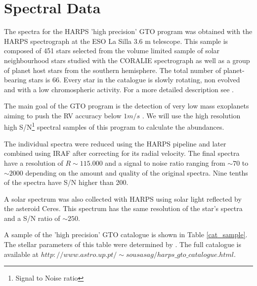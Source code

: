 \documentclass[dvips,12pt,a4paper]{report}
\begin{document}
{\section {Spectral Data}

The spectra for the HARPS 'high precision' GTO program was obtained with the HARPS spectrograph at the ESO La Silla 3.6 m telescope. This sample is composed of 451 stars selected from the volume limited sample of solar neighbourhood stars studied with the CORALIE spectrograph \citep{Udry-2000} as well as a group of planet host stars from the southern hemisphere. The total number of planet-bearing stars is 66. Every star in the catalogue is slowly rotating, non evolved and with a low chromospheric activity. For a more detailed description see \citet{Sousa-2008}.

The main goal of the GTO program is the detection of very low mass exoplanets aiming to push the RV accuracy below  $1m/s$ \citep{Mayor-2003b}. We will use the high resolution high S/N\footnote{Signal to Noise ratio} spectral samples of this program to calculate the abundances.

The individual spectra were reduced using the HARPS pipeline and later combined using IRAF after correcting for its radial velocity. The final spectra have a resolution of $R\sim115.000$ and a signal to noise ratio ranging from $\sim70$ to $\sim2000$ depending on the amount and quality of the original spectra. Nine tenths of the spectra have S/N higher than 200.


A solar spectrum was also collected with HARPS using solar light reflected by the asteroid Ceres. This spectrum has the same resolution of the star's spectra and a S/N ratio of $\sim250$.

A sample of the 'high precision' GTO catalogue is shown in Table \ref{cat_sample}. The stellar parameters of this table were determined by \citet{Sousa-2008}. The full catalogue is available at $http://www.astro.up.pt/\sim sousasag/harps\_gto\_catalogue.html$.

}
\end{document}
